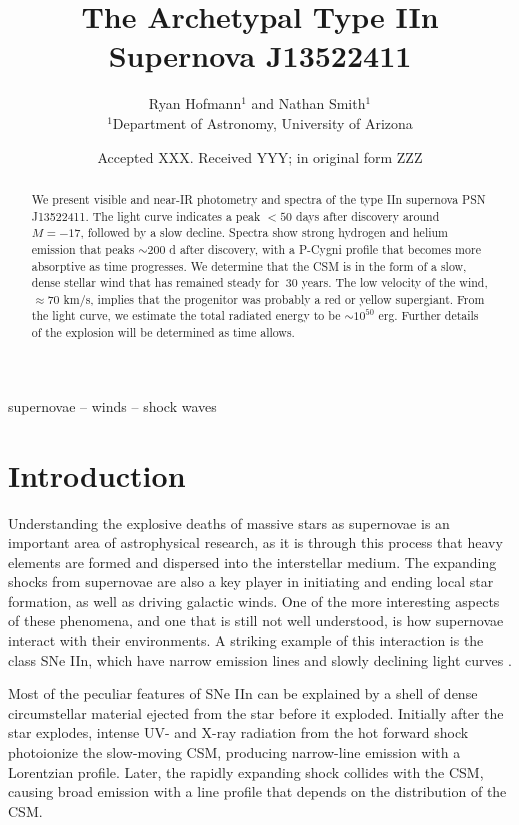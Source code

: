 \documentclass[a4paper,fleqn,usenatbib]{mnras}
\title[SN IIn Archetype J13522411]{The Archetypal Type IIn Supernova J13522411}
\author[R. Hofmann and N. Smith]{
Ryan Hofmann$^{1}$
and Nathan Smith$^{1}$
\\
$^{1}$Department of Astronomy, University of Arizona
}
\date{Accepted XXX. Received YYY; in original form ZZZ}
\begin{document}
\label{firstpage}
\pagerange{\pageref{firstpage}--\pageref{lastpage}}
\maketitle

\begin{abstract}
We present visible and near-IR photometry and spectra of the type IIn supernova PSN J13522411. The light curve indicates a peak $<50$ days after discovery around $M = -17$, followed by a slow decline. Spectra show strong hydrogen and helium emission that peaks $\sim200$ d after discovery, with a P-Cygni profile that becomes more absorptive as time progresses. We determine that the CSM is in the form of a slow, dense stellar wind that has remained steady for $\>30$ years. The low velocity of the wind, $\approx70$ km/s, implies that the progenitor was probably a red or yellow supergiant. From the light curve, we estimate the total radiated energy to be $\sim10^{50}$ erg. Further details of the explosion will be determined as time allows.
\end{abstract}

\begin{keywords}
supernovae -- winds -- shock waves
\end{keywords}


\section{Introduction} \label{intro}

Understanding the explosive deaths of massive stars as supernovae is an important area of astrophysical research, as it is through this process that heavy elements are formed and dispersed into the interstellar medium. The expanding shocks from supernovae are also a key player in initiating and ending local star formation, as well as driving galactic winds. One of the more interesting aspects of these phenomena, and one that is still not well understood, is how supernovae interact with their environments. A striking example of this interaction is the class SNe IIn, which have narrow emission lines and slowly declining light curves \citep{Fil97}.

Most of the peculiar features of SNe IIn can be explained by a shell of dense circumstellar material ejected from the star before it exploded. Initially after the star explodes, intense UV- and X-ray radiation from the hot forward shock photoionize the slow-moving CSM, producing narrow-line emission with a Lorentzian profile. Later, the rapidly expanding shock collides with the CSM, causing broad emission with a line profile that depends on the distribution of the CSM.
\end{document}
